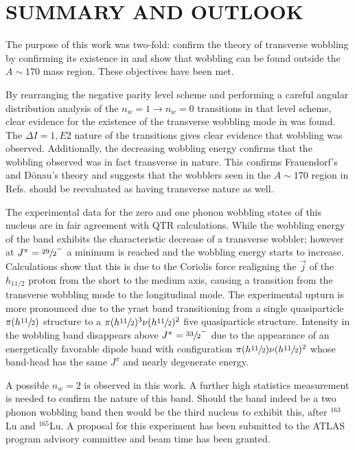 %
%

\chapter{SUMMARY AND OUTLOOK}
\label{chp:wob-disc}

The purpose of this work was two-fold: confirm the theory of transverse wobbling by confirming its existence in \pr{} and show that wobbling can be found outside the $A\sim{}170$ mass region. These objectives have been met.

By rearranging the negative parity level scheme and performing a careful angular distribution analysis of the $n_w=1\rightarrow{}n_w=0$ transitions in that level scheme, clear evidence for the existence of the transverse wobbling mode in \pr{} was found. The $\Delta{}I=1, E2$ nature of the transitions gives clear evidence that wobbling was observed. Additionally, the decreasing wobbling energy confirms that the wobbling observed was in fact transverse in nature. This confirms Frauendorf's and D\"onau's theory and suggests that the wobblers seen in the $A\sim{}170$ region in Refs. \cite{wobblingIn163Lu,wobblingIn161Lu,wobblingIn165Lu,wobblingIn167Lu,wobblingIn167Ta} should be reevaluated as having transverse nature as well.

The experimental data for the zero and one phonon wobbling states of this nucleus are in fair agreement with QTR calculations. While the wobbling energy of the band exhibits the characteristic decrease of a transverse wobbler; however at $J^{\pi}=\sfrac{29}{2}^-$ a minimum is reached and the wobbling energy starts to increase. Calculations show that this is due to the Coriolis force realigning the $\vec{j}$ of the $h_{11/2}$ proton from the short to the medium axis, causing a transition from the transverse wobbling mode to the longitudinal mode. The experimental upturn is more pronounced due to the yrast band transitioning from a single quasiparticle $\pi{}(h\sfrac{11}{2})$ structure to a $\pi{}(h\sfrac{11}{2})^3\nu{}(h\sfrac{11}{2})^2$ five quasiparticle structure. Intensity in the wobbling band disappears above $J^{\pi}=\sfrac{33}{2}^-$ due to the appearance of an energetically favorable dipole band with configuration $\pi{}(h\sfrac{11}{2})\nu{}(h\sfrac{11}{2})^2$ whose band-head has the same $J^{\pi}$ and nearly degenerate energy.

A possible $n_w=2$ is observed in this work. A further high statistics measurement is needed to confirm the nature of this band. Should the band indeed be a two phonon wobbling band then \pr{} would be the third nucleus to exhibit this, after $^{163}$Lu and $^{165}$Lu. A proposal for this experiment has been submitted to the ATLAS program advisory committee and beam time has been granted.


